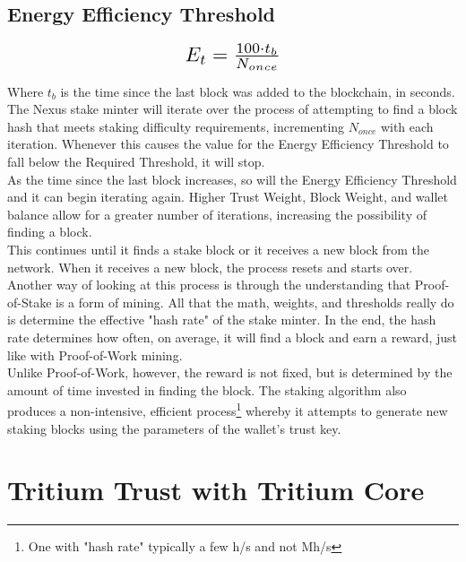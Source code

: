 \documentclass[11pt]{article}
\begin{document}
\subsection{Energy Efficiency Threshold}

\begin{equation}
\resizebox{.22\hsize}{!}{$E_{t} = \frac{100 \cdot t_{b}}{N_{once}}$}
\end{equation}

\noindent Where $t_{b}$ is the time since the last block was added to the blockchain, in seconds.\\

\noindent The Nexus stake minter will iterate over the process of attempting to find a block hash that meets staking difficulty requirements, incrementing $N_{once}$ with each iteration. Whenever this causes the value for the Energy Efficiency Threshold to fall below the Required Threshold, it will stop.\\

\noindent As the time since the last block increases, so will the Energy Efficiency Threshold and it can begin iterating again. Higher Trust Weight, Block Weight, and wallet balance allow for a greater number of iterations, increasing the possibility of finding a block.\\

\noindent This continues until it finds a stake block or it receives a new block from the network. When it receives a new block, the process resets and starts over.\\

\noindent Another way of looking at this process is through the understanding that Proof-of-Stake is a form of mining. All that the math, weights, and thresholds really do is determine the effective "hash rate" of the stake minter. In the end, the hash rate determines how often, on average, it will find a block and earn a reward, just like with Proof-of-Work mining.\\

\noindent Unlike Proof-of-Work, however, the reward is not fixed, but is determined by the amount of time invested in finding the block. The staking algorithm also produces a non-intensive, efficient process\footnote{One with "hash rate" typically a few h/s and not Mh/s} whereby it attempts to generate new staking blocks using the parameters of the wallet’s trust key.\\

\bigskip

\section{Tritium Trust with Tritium Core}
\end{document}
